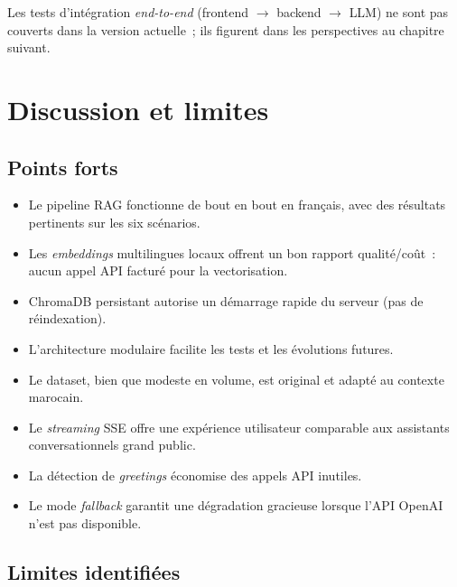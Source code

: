Les tests d'intégration \textit{end-to-end} (frontend $\to$ backend $\to$ \ac{LLM}) ne sont pas couverts dans la version actuelle~; ils figurent dans les perspectives au chapitre suivant.

\section{Discussion et limites}

\subsection{Points forts}

\begin{itemize}
  \item Le pipeline \ac{RAG} fonctionne de bout en bout en français, avec des résultats pertinents sur les six scénarios.
  \item Les \textit{embeddings} multilingues locaux offrent un bon rapport qualité/coût~: aucun appel \ac{API} facturé pour la vectorisation.
  \item ChromaDB persistant autorise un démarrage rapide du serveur (pas de réindexation).
  \item L'architecture modulaire facilite les tests et les évolutions futures.
  \item Le dataset, bien que modeste en volume, est original et adapté au contexte marocain.
  \item Le \textit{streaming} \ac{SSE} offre une expérience utilisateur comparable aux assistants conversationnels grand public.
  \item La détection de \textit{greetings} économise des appels \ac{API} inutiles.
  \item Le mode \textit{fallback} garantit une dégradation gracieuse lorsque l'\ac{API} OpenAI n'est pas disponible.
\end{itemize}

\subsection{Limites identifiées}

